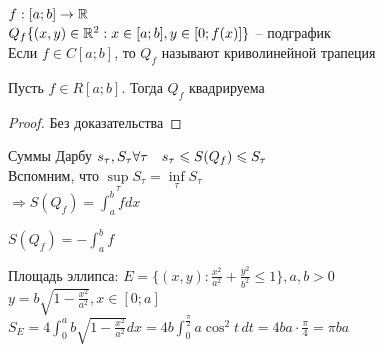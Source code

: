\begin{figure*}[h]
	\centering
	\def\svgwidth{0.4\columnwidth}
	
  \end{figure*}


\begin{Def} 
	$f: [a;b] \to \mathbb{R}$\\ $Q_f\{(x, y) \in \mathbb{R}^2: x\in [a;b], y \in [0; f(x)]\}$ -- подграфик\\
	Если $f \in C[a;b]$, то $Q_f$ называют криволинейной трапеция\\
\end{Def} 

\begin{Thm} 
	Пусть $f \in R[a;b].$ Тогда $Q_f$ квадрируема 
\end{Thm} 

\begin{proof}
	Без доказательства
\end{proof}

\begin{Rem}
	Суммы Дарбу $s_{\tau}, S_{\tau}\\
	\forall \tau \ \ \ s_{\tau} \leqslant S(Q_f) \leqslant S_{\tau}$\\
	Вспомним, что $\underset{\tau}{\sup} S_{\tau} = \underset{\tau}{\inf} S_{\tau}$\\
	$\Rightarrow S(Q_f) = \displaystyle \int_{a}^{b} f dx$
\end{Rem}

\begin{Rem}
	$\displaystyle S(Q_f) = - \int_{a}^{b} f$
\end{Rem}

\begin{Example}
	Площадь эллипса: $\displaystyle E = \{(x, y): \frac{x^2}{a^2} + \frac{y^2}{b^2} \leqslant 1\}, a, b > 0$\\
	$\displaystyle y = b \sqrt{1 - \frac{x^2}{a^2}}, x\in [0;a]$\\
	$\displaystyle S_E = 4 \int_{0}^{a} b	\sqrt{1 - \frac{x^2}{a^2}} dx = 4b \int_{0}^{\frac{\pi}{2}} a \cos^2 t \,dt = 4ba \cdot \frac{\pi}{4} = \pi ba$
\end{Example}

\def\AuthorName{Илья Дудников}


\begin{figure*}[h]
	\centering
	\def\svgwidth{.15\columnwidth}
	
\end{figure*}

